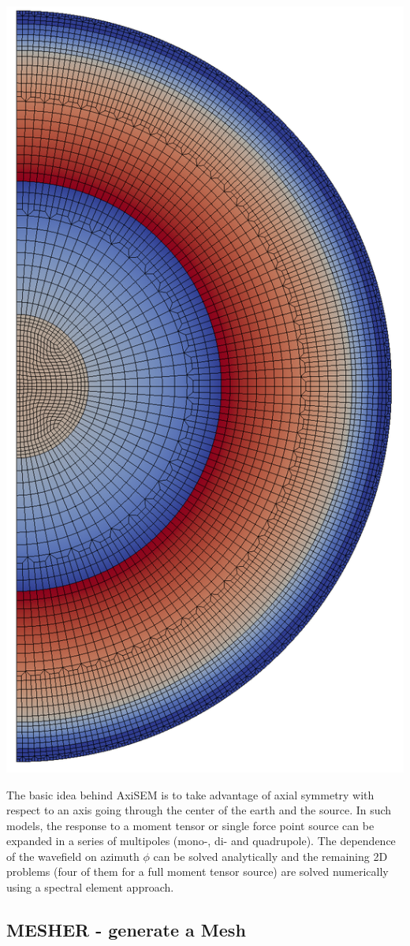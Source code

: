 \documentclass{article}
\begin{document}
\begin{center}
\begin{minipage}[t]{0.25\paperwidth}
        \includegraphics[width=.7\textwidth]{mesh.png}
    \end{minipage}%
\end{center}

The basic idea behind AxiSEM is to take advantage of axial symmetry with respect
to an axis going through the center of the earth and the source. In such models,
the response to a moment tensor or single force point source can be expanded in a series
of multipoles (mono-, di- and quadrupole). The dependence of the wavefield on azimuth
$\phi$ can be solved analytically and the remaining 2D problems (four of them for a full
moment tensor source) are solved numerically using a spectral element approach.


\subsection{MESHER - generate a Mesh}
\end{document}
